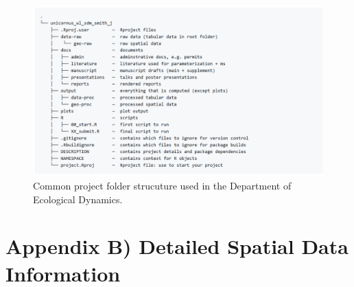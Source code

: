 \documentclass[
  english,
]{article}
\begin{document}
\begin{figure}
\includegraphics[width=1\linewidth]{./src/folder_structure_d6_projects} \caption{Common project folder strucuture used in the Department of Ecological Dynamics.}\label{fig:unnamed-chunk-2}
\end{figure}

\newpage

\hypertarget{appendix-b-detailed-spatial-data-information}{%
\section{Appendix B) Detailed Spatial Data
Information}\label{appendix-b-detailed-spatial-data-information}}
\end{document}
